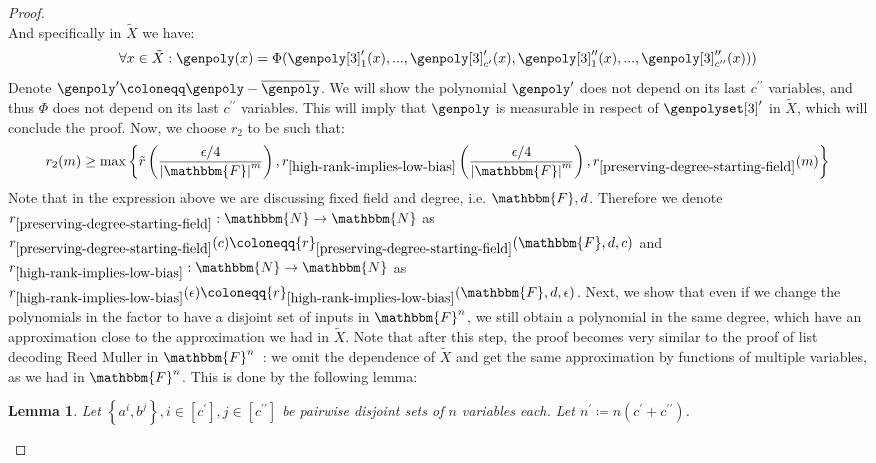 \documentclass[10pt,a4paper]{article}
\newtheorem{lemma}[theorem]{Lemma}
\newcommand{\definedas}[0]{\coloneqq}
\newcommand{\parens}[1]{\left( #1 \right)}
\newcommand{\set}[1]{\left\{ #1 \right\}}
\newcommand{\basefield}[0]{\mathbbm{F}}
\newcommand{\blocklength}[0]{n}
\newcommand{\field}[0]{\basefield^{\blocklength}}
\newcommand{\degree}[0]{d}
\newcommand{\funcdef}[3]{#1:#2\rightarrow#3}
\newcommand{\naturalnumbersset}[0]{\mathbbm{N}}
\newcommand{\relativeremainder}[1]{\overline{#1}}
\newcommand{\variety}{{\tilde{X}}}
\newcommand{\rankval}[0]{{{r}}}
\newcommand{\rankfunc}[0]{{{{r}}}}
\newcommand{\rankbiasfunc}[0]{{\tilde{r}}}
\newcommand{\abs}[1]{\left| #1 \right|}
\begin{document}
\begin{proof}
\[    \]
    And specifically in $\variety$ we have:
    \[
        \forall x \in \variety: \genpoly(x) = \Phi(\genpoly[3]^\prime_1(x),...,\genpoly[3]^\prime_{c^\prime}(x), \genpoly[3]^{\prime\prime}_1(x),...,\genpoly[3]^{\prime\prime}_{c^{\prime\prime}}(x)))
    \]
    Denote $\genpoly^{\prime} \definedas \genpoly - \relativeremainder{\genpoly}$.
    We will show the polynomial $\genpoly^{\prime}$ does not depend on its last $c^{\prime\prime}$ variables, and thus $\Phi$ does not depend on its last $c^{\prime\prime}$ variables.
    This will imply that $\genpoly$ is measurable in respect of $\genpolyset[3]^\prime$ in $\variety$, which will conclude the proof.
    \newline
    Now, we choose $\rankfunc_2$ to be such that:
    \[
        \rankfunc_2(m) \geq \max \set {
            \rankbiasfunc \parens{\dfrac{\epsilon / 4}{\abs{\basefield}^m}},
            \rankval_{\ref{high-rank-implies-low-bias}}\parens{\dfrac{\epsilon / 4}{\abs{\basefield}^m}},
            \rankval_{\ref{preserving-degree-starting-field}}(m)
        }
    \]
    Note that in the expression above we are discussing fixed field and degree, i.e. $\basefield, \degree$.
    Therefore we denote $\funcdef{\rankfunc_{\ref{preserving-degree-starting-field}}}{\naturalnumbersset}{\naturalnumbersset}$
    as $\rankfunc_{\ref{preserving-degree-starting-field}}(c) \definedas \rankfunc_{\ref{preserving-degree-starting-field}}(\basefield, \degree, c)$
    and $\funcdef{\rankfunc_{\ref{high-rank-implies-low-bias}}}{\naturalnumbersset}{\naturalnumbersset}$
    as $\rankfunc_{\ref{high-rank-implies-low-bias}}(\epsilon) \definedas \rankfunc_{\ref{high-rank-implies-low-bias}}(\basefield, \degree, \epsilon)$.
    \newline
    Next, we show that even if we change the polynomials in the factor to have a disjoint set of inputs in $\field$,
    we still obtain a polynomial in the same degree, which have an approximation close to the approximation we had in $\variety$.
    Note that after this step, the proof becomes very similar to the proof of list decoding Reed Muller in $\field$~\cite[Theorem 1]{bhowmick2014list}:
    we omit the dependence of $\variety$ and get the same approximation by functions of multiple variables,
    as we had in $\field$.
    This is done by the following lemma:
    \begin{lemma}
        Let $\set{a^{i}, b^{j}}, i \in [c^\prime], j \in [c^{\prime\prime}]$  be pairwise disjoint sets of $\blocklength$ variables each.
        Let $\blocklength^{\prime} \definedas \blocklength(c^\prime + c^{\prime\prime})$.

\end{lemma}
\end{proof}
\end{document}
